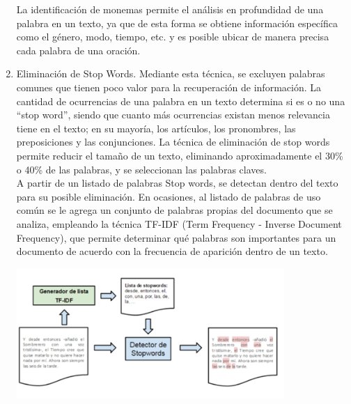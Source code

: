 \begin{enumerate}
\begin{enumerate}
\end{enumerate}
La identificación de monemas permite el análisis en profundidad de una palabra en un texto, ya que de esta forma se obtiene información específica como el género, modo, tiempo, etc. y es posible ubicar de manera precisa cada palabra de una oración.

\item Eliminación de Stop Words. Mediante esta técnica, se excluyen palabras comunes que tienen poco valor para la recuperación de información. La cantidad de ocurrencias de una palabra en un texto determina si es o no una “stop word”, siendo que cuanto más ocurrencias existan menos relevancia tiene en el texto; en su mayoría, los artículos, los pronombres, las preposiciones y las conjunciones. La técnica de eliminación de stop words permite reducir el tamaño de un texto, eliminando aproximadamente el 30\% o 40\% de las palabras, y se seleccionan las palabras claves. \\

A partir de un listado de palabras Stop words, se detectan dentro del texto para su posible eliminación. En ocasiones, al listado de palabras de uso común se le agrega un conjunto de palabras propias del documento que se analiza, empleando la técnica TF-IDF (Term Frequency - Inverse Document Frequency), que permite determinar qué palabras son importantes para un documento de acuerdo con la frecuencia de aparición dentro de un texto.
\begin{center}
    \includegraphics[width=0.8\textwidth]{Images/stop.png}
\end{center}


\end{enumerate}
